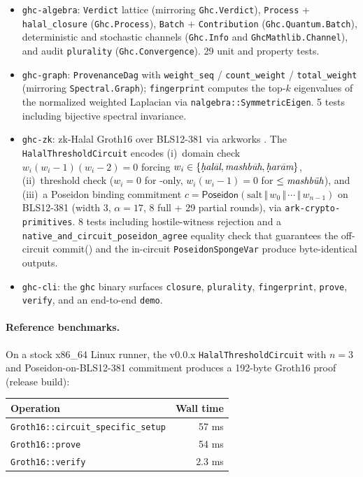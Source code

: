 \begin{itemize}
\item \texttt{ghc-algebra}: \texttt{Verdict} lattice (mirroring
  \texttt{Ghc.Verdict}), \texttt{Process} + \texttt{halal\_closure}
  (\texttt{Ghc.Process}), \texttt{Batch} + \texttt{Contribution}
  (\texttt{Ghc.Quantum.Batch}), deterministic and stochastic channels
  (\texttt{Ghc.Info} and \texttt{GhcMathlib.Channel}), and audit
  \texttt{plurality} (\texttt{Ghc.Convergence}). 29 unit and property
  tests.
\item \texttt{ghc-graph}: \texttt{ProvenanceDag} with
  \texttt{weight\_seq} / \texttt{count\_weight} / \texttt{total\_weight}
  (mirroring \texttt{Spectral.Graph}); \texttt{fingerprint} computes
  the top-$k$ eigenvalues of the normalized weighted Laplacian via
  \texttt{nalgebra::SymmetricEigen}. 5 tests including bijective
  spectral invariance.
\item \texttt{ghc-zk}: zk-Halal Groth16 over BLS12-381 via arkworks
  \cite{arkworks}. The \texttt{HalalThresholdCircuit} encodes
  (i)~domain check $w_i (w_i - 1)(w_i - 2) = 0$ forcing
  $w_i \in \{\halal, \mashbuh, \haram\}$, (ii)~threshold check
  ($w_i = 0$ for \halal-only, $w_i (w_i - 1) = 0$ for $\leq \mashbuh$),
  and (iii)~a Poseidon binding commitment
  $c = \mathsf{Poseidon}(\mathrm{salt} \,\Vert\, w_0 \,\Vert\, \dotsb
  \,\Vert\, w_{n-1})$ on BLS12-381 (width 3, $\alpha = 17$, 8 full +
  29 partial rounds), via \texttt{ark-crypto-primitives}. 8 tests
  including hostile-witness rejection and a
  \texttt{native\_and\_circuit\_poseidon\_agree} equality check that
  guarantees the off-circuit commit() and the in-circuit
  \texttt{PoseidonSpongeVar} produce byte-identical outputs.
\item \texttt{ghc-cli}: the \texttt{ghc} binary surfaces
  \texttt{closure}, \texttt{plurality}, \texttt{fingerprint},
  \texttt{prove}, \texttt{verify}, and an end-to-end \texttt{demo}.
\end{itemize}

\paragraph{Reference benchmarks.} On a stock x86\_64 Linux runner,
the v0.0.x \texttt{HalalThresholdCircuit} with $n = 3$ and
Poseidon-on-BLS12-381 commitment produces a 192-byte Groth16 proof
(release build):

\begin{center}
\begin{tabular}{lr}
\toprule
Operation & Wall time \\
\midrule
\texttt{Groth16::circuit\_specific\_setup} & 57 ms \\
\texttt{Groth16::prove}                    & 54 ms \\
\texttt{Groth16::verify}                   & 2.3 ms \\
\bottomrule
\end{tabular}
\end{center}

